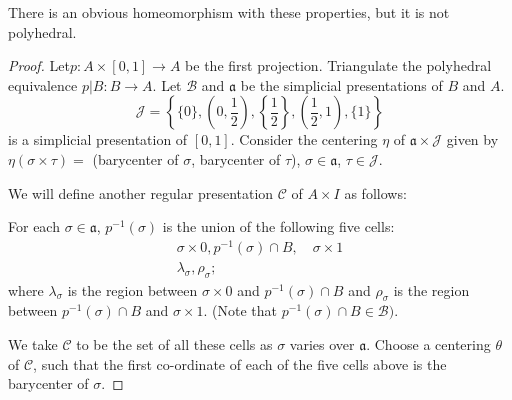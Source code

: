 \begin{remark*}
There is an obvious homeomorphism with these properties, but it is not polyhedral. 
\end{remark*}

\begin{proof}
Let\pageoriginale $p:A\times[0,1]\to A$ be the first projection. Triangulate the polyhedral equivalence $p|B:B\to A$. Let $\mathscr{B}$ and $\mathfrak{a}$ be the simplicial presentations of $B$ and $A$.
$$
\mathscr{J}=\left\{\{0\},\left(0,\frac{1}{2}\right),\left\{\frac{1}{2}\right\},\left(\frac{1}{2},1\right),\{1\}\right\} 
$$
is a simplicial presentation of $[0,1]$. Consider the centering $\eta$ of $\mathfrak{a}\times\mathscr{J}$ given by $\eta(\sigma\times\tau)=$ (barycenter of $\sigma$, barycenter of $\tau$), $\sigma\in\mathfrak{a}$, $\tau\in \mathscr{J}$.

We will define another regular presentation $\mathscr{C}$ of $A\times I$ as follows:

For each $\sigma\in \mathfrak{a}$, $p^{-1}(\sigma)$ is the union of the following five cells:
\begin{gather*}
\sigma\times 0,p^{-1}(\sigma)\cap B,\quad \sigma\times 1\\
\lambda_{\sigma},\rho_{\sigma};
\end{gather*}
where $\lambda_{\sigma}$ is the region between $\sigma\times 0$ and $p^{-1}(\sigma)\cap B$ and $\rho_{\sigma}$ is the region between $p^{-1}(\sigma)\cap B$ and $\sigma\times 1$. (Note that $p^{-1}(\sigma)\cap B\in\mathscr{B})$.

We take $\mathscr{C}$ to be the set of all these cells as $\sigma$ varies over $\mathfrak{a}$. Choose a centering $\theta$ of $\mathscr{C}$, such that the first co-ordinate of each of the five cells above is the barycenter of $\sigma$.


\end{proof}
